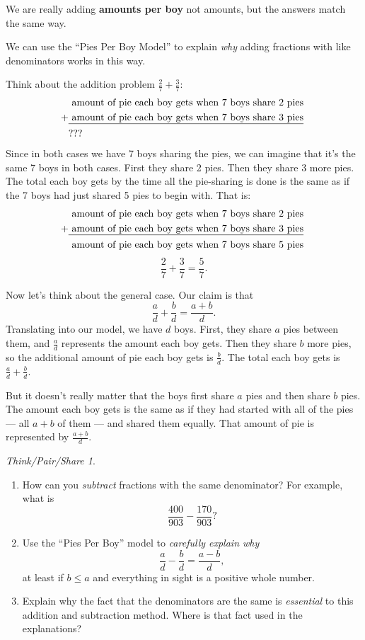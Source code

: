\documentclass[10pt, reqno]{amsart}
\theoremstyle{remark}
\newtheorem*{thinkpair*}{Think/Pair/Share}
\theoremstyle{definition}
\numberwithin{equation}{section}  %
\begin{document}
We are really adding {\bf amounts per boy} not amounts, but the answers match the same way.

We can use the ``Pies Per Boy Model'' to explain \emph{why}  adding fractions with like denominators works in this way.  

Think about the addition problem $\frac 2 7 + \frac 3 7$:
\begin{align*}
&\text{ amount of pie each boy gets when 7 boys share 2 pies} \\
+ 
&\text{\underline{ amount of pie each boy gets when 7 boys share 3 pies} }\\ 
&???
\end{align*}
Since in both cases we have 7 boys sharing the pies, we can imagine that it's the same 7 boys in both cases.  First they share 2 pies.  Then they share 3 more pies.  The total each boy gets by the time all the pie-sharing is done is the same as if the 7 boys had just shared 5 pies to begin with.  That is:
\begin{align*}
&\text{ amount of pie each boy gets when 7 boys share 2 pies} \\
+ 
&\text{\underline{ amount of pie each boy gets when 7 boys share 3 pies} }\\ 
&\text{ amount of pie each boy gets when 7 boys share 5 pies}\\ 
\end{align*}
\[
\frac 2 7 + \frac 3 7 = \frac 5 7.
\]

Now let's think about the general case.  Our claim is that
\[
\frac a d + \frac b d = \frac{a+b}d.
\]
Translating into our model, we have $d$ boys.  First, they share $a$ pies between them, and $\frac a d$ represents the amount each boy gets.  Then they share $b$ more pies, so the additional amount of pie each boy gets is $\frac b d$.  The total each boy gets is $\frac a d + \frac b d$.

But it doesn't really matter that the boys first share $a$ pies and then share $b$ pies.  The amount each boy gets is the same as if they had started with all of the pies --- all $a+b$ of them --- and shared them equally.  That amount of pie is represented by $\frac{a+b}d$.  



\begin{thinkpair*}\ 
\begin{enumerate}
\item
How can you \emph{subtract} fractions with
the same denominator? For example, what is
\[
\frac{400 }{903} -\frac{170}{903}?
\]

\item
Use the ``Pies Per Boy'' model to \emph{carefully explain why}
\[
\frac a d - \frac b d = \frac{a-b}{d},
\]
at least if $b \leq a$ and everything in sight is a positive whole number.

\item
Explain why the fact that the denominators are the same is \emph{essential} to this addition and subtraction method.  Where is that fact used in the explanations?
\end{enumerate}
\end{thinkpair*}
\end{document}
